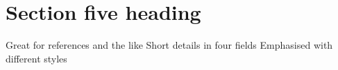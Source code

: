 \section{Section five heading}

      {Great for references and the like}
      {Short details in four fields}
      {Emphasised with different styles}
